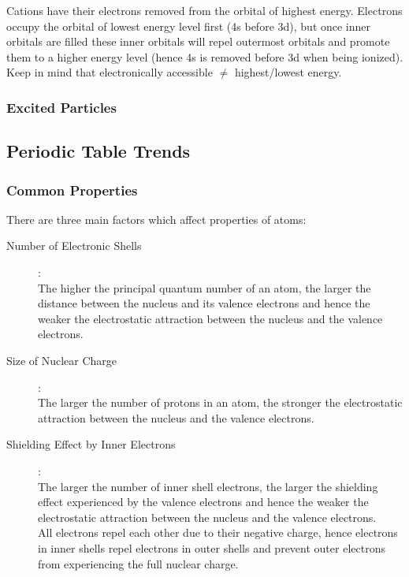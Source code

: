 \documentclass[../main]{subfiles}
\begin{document}
	Cations have their electrons removed from the orbital of highest energy. Electrons occupy the orbital of lowest energy level first (4s before 3d), but once inner orbitals are filled these inner orbitals will repel outermost orbitals and promote them to a higher energy level (hence 4s is removed before 3d when being ionized). \\

	Keep in mind that electronically accessible \(\neq\) highest/lowest energy.

	\subsubsection{Excited Particles}



	\subsection{Periodic Table Trends}

	\subsubsection{Common Properties}

	There are three main factors which affect properties of atoms:

	\begin{description}
	\item[Number of Electronic Shells]:\\
		The higher the principal quantum number of an atom, the larger the distance between the nucleus and its valence electrons and hence the weaker the electrostatic attraction between the nucleus and the valence electrons.
	\item[Size of Nuclear Charge]:\\
		The larger the number of protons in an atom, the stronger the electrostatic attraction between the nucleus and the valence electrons.
	\item[Shielding Effect by Inner Electrons]:\\
		The larger the number of inner shell electrons, the larger the shielding effect experienced by the valence electrons and hence the weaker the electrostatic attraction between the nucleus and the valence electrons. \\
		All electrons repel each other due to their negative charge, hence electrons in inner shells repel electrons in outer shells and prevent outer electrons from experiencing the full nuclear charge.
	\end{description}
\end{document}
